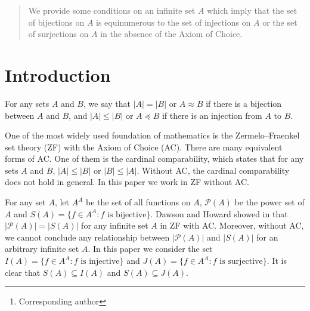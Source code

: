 \documentclass[a4paper,12pt,review]{article} %
\author[1]{Natthajak Kamkru}
\author[2]{Nattapon Sonpanow\thanks{Corresponding author}}
\affil[1,2]{Department of Mathematics and Computer
Science, Faculty of Science, Chulalongkorn
University, Bangkok, Thailand}
\theoremstyle{definition}
\numberwithin{equation}{section}
\begin{document}

\maketitle

\begin{abstract}
We provide some conditions on an infinite set $A$ which imply that the set of bijections on $A$ is equinumerous to the set of injections on $A$ or the set of surjections on $A$ in the absence of the Axiom of Choice.
\end{abstract}



\section{Introduction}


For any sets $A$ and $B$, we say that $|A|=|B|$ or $A\approx B$ if there is a bijection between $A$ and $B$, and $|A|\leq|B|$ or $A\preceq B$ if there is an injection from $A$ to $B$.

One of the most widely used foundation of mathematics is the Zermelo–Fraenkel set theory (ZF) with the Axiom of Choice (AC). There are many equivalent forms of AC. One of them is the cardinal comparability, which states that for any sets $A$ and $B$, $|A|\leq |B|$ or $|B|\leq|A|$. Without AC, the cardinal comparability does not hold in general. In this paper we work in ZF without AC.

For any set $A$, let $A^{A}$ be the set of all functions on $A$, $\mathcal{P}(A)$ be the power set of $A$ and $S(A)=\{f\in A^{A}:f \text{ is bijective}\}$. Dawson and Howard showed in \cite{DH} that $|\mathcal{P}(A)|=|S(A)|$ for any infinite set $A$ in ZF with AC. Moreover, without AC, we cannot conclude any relationship between $|\mathcal{P}(A)|$ and $|S(A)|$ for an arbitrary infinite
set $A$. In this paper we consider the set $I(A)=\{f\in A^{A}:f \text{ is injective}\}$ and $J(A)=\{f\in A^{A}:f \text{ is surjective}\}$. It is clear that $S(A)\subseteq I(A)$ and $S(A)\subseteq J(A)$.
\end{document}
